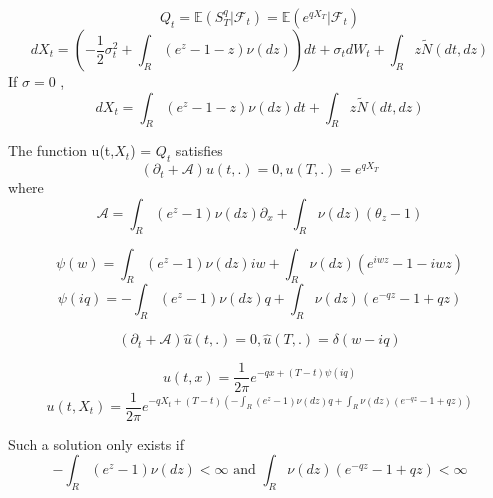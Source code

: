\documentclass[a4paper,11pt]{article}
\begin{document}
\begin{enumerate}
\begin{enumerate}
\[Q_t = \mathbb{E}(S_T^q|\mathcal{F}_t) = \mathbb{E}(e^{qX_T}|\mathcal{F}_t)\] 
\[dX_t  = ( - \frac{1}{2}\sigma_t^2 + \int_R (e^{z}-1-z)\nu(dz)) dt+ \sigma_t dW_t +\int_R z \widetilde{N}(dt,dz)\]
 If $\sigma = 0$ ,
 \[dX_t  =   \int_R (e^{z}-1-z)\nu(dz) dt +\int_R z \widetilde{N}(dt,dz)\]

The function u(t,$X_t$) = $ Q_t$ satisfies
\[(\partial_t + \mathcal{A})u(t,.)= 0,  u(T,.)= e^{qX_T} \]
where 
\[\mathcal{A}  = 
\int_R (e^{z}-1) \nu(dz)
\partial_x + \int_R  \nu(dz)(\theta_z-1) \]

\[\psi(w) = \int_R (e^{z}-1) \nu(dz) i w + \int_R \nu(dz) (e^{iwz}-1-iwz)\]
\[\psi(iq) = -\int_R (e^{z}-1) \nu(dz) q + \int_R \nu(dz) (e^{-qz}-1+qz)\]
 
 \[(\partial_t + \mathcal{A}) \hat{u}(t,.)= 0,  \hat{u}(T,.)= \delta(w-iq) \]
 
 \[u(t,x) = \frac{1}{2\pi}  e^{-qx+(T-t)\psi(iq) }\]
\[\boxed{u(t,X_t) = \frac{1}{2\pi}  e^{-qX_t+(T-t)(-\int_R (e^{z}-1) \nu(dz) q + \int_R \nu(dz) (e^{-qz}-1+qz))} }\]

Such a solution only exists if 
\[- \int_R (e^{z}-1) \nu(dz)  < \infty \text{ and } \int_R \nu(dz) (e^{-qz}-1+qz)  < \infty\]
\end{enumerate}


\end{enumerate}
\end{document}
